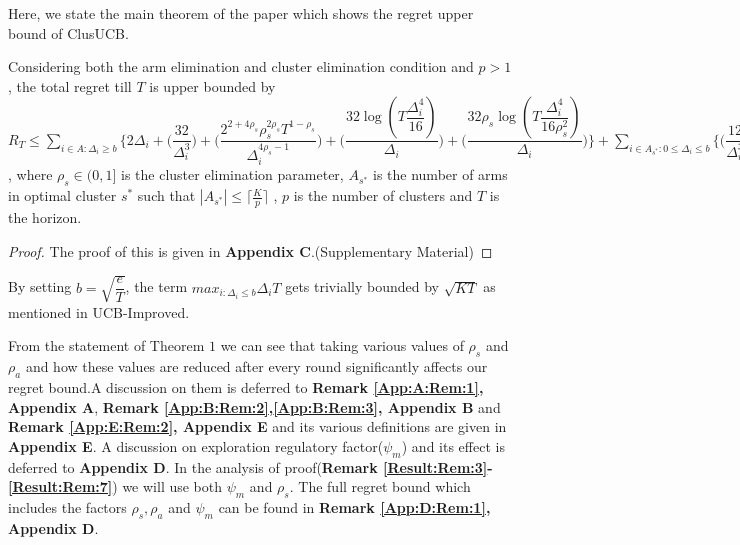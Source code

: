 	
	Here, we state the main theorem of the paper which shows the regret upper bound of ClusUCB.
	
\begin{theorem}
\label{Result:Theorem:1}
Considering both the arm elimination and cluster elimination condition and $p>1$, the total regret till $T$ is upper bounded by $R_{T}\leq \sum_{i\in A:\Delta_{i}\geq b} \bigg\lbrace 2\Delta_{i}+ \bigg(\dfrac{32}{\Delta_{i}^{3}}\bigg) + \bigg(\dfrac{2^{2+4\rho_{s}}\rho_{s}^{2\rho_{s}}T^{1-\rho_{s}}}{\Delta_{i}^{4\rho_{s}-1}}\bigg) + \bigg(\dfrac{32\log{(T\dfrac{\Delta_{i}^{4}}{16})}}{\Delta_{i}}\bigg) + \bigg(\dfrac{32\rho_{s}\log{(T\dfrac{\Delta_{i}^{4}}{16\rho_{s}^{2}})}}{\Delta_{i}}\bigg)\bigg\rbrace + \sum_{i\in A_{s^{*}}:0\leq\Delta_{i}\leq b}\bigg\lbrace \bigg(\dfrac{12}{\Delta_{i}^{3}} \bigg) + \bigg(\dfrac{12}{b^{3}} \bigg)\bigg\rbrace + \sum_{i\in A:0\leq\Delta_{i}\leq b}\bigg\lbrace \bigg(\dfrac{T^{1-\rho_{s}}\rho_{s}^{2\rho_{s}}2^{2\rho_{s}+3}}{\Delta_{i}^{4\rho_{s}-1}} \bigg)+\bigg(\dfrac{T^{1-\rho_{s}}\rho_{s}^{2\rho_{s}}2^{2\rho_{s}+3}}{b^{4\rho_{s} -1}} \bigg) \bigg\rbrace + max_{i:\Delta_{i}\leq b}\Delta_{i}T $, where $\rho_{s}\in (0,1]$ is the cluster elimination parameter, $A_{s^{*}}$ is the number of arms in optimal cluster $s^{*}$ such that $|A_{s^{*}}|\leq \big\lceil\frac{K}{p}\big\rceil$ , $p$ is the number of clusters and $T$ is the horizon.
\end{theorem}

\begin{proof}
	The proof of this is given in \textbf{Appendix C}.(Supplementary Material)
\end{proof}

\begin{remark}
\label{Result:Rem:1}
By setting $b=\sqrt{\dfrac{e}{T}}$, the term $max_{i:\Delta_{i}\leq b}\Delta_{i}T$ gets trivially bounded by $\sqrt{KT}$ as mentioned in UCB-Improved.
\end{remark}

\begin{remark}
\label{Result:Rem:2}
From the statement of Theorem $1$ we can see that taking various values of $\rho_{s}$ and $\rho_{a}$ and how these values are reduced after every round significantly affects our regret bound.A discussion on them is deferred to \textbf{Remark \ref{App:A:Rem:1}, Appendix A}, \textbf{Remark \ref{App:B:Rem:2},\ref{App:B:Rem:3}, Appendix B} and \textbf{Remark \ref{App:E:Rem:2}, Appendix E} and its various definitions are given in \textbf{Appendix E}. A discussion on exploration regulatory factor($\psi_{m}$) and its effect is deferred to \textbf{Appendix D}. In the analysis of proof(\textbf{Remark \ref{Result:Rem:3}-\ref{Result:Rem:7}}) we will use both $\psi_{m}$ and $\rho_{s}$. The full regret bound which includes the factors $\rho_{s},\rho_{a}$ and $\psi_{m}$ can be found in \textbf{Remark \ref{App:D:Rem:1}, Appendix D}.
\end{remark}

